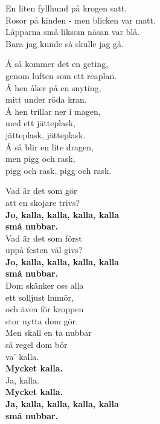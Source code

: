 \documentclass[a6paper, 10pt, twoside]{article}
\begin{document}
\vspace{20pt}
\begin{center}
\end{center}
\begin{lyrics}
En liten fyllhund på krogen satt. \\
Rosor på kinden - men blicken var matt. \\
Läpparna små liksom näsan var blå. \\
Bara jag kunde så skulle jag gå. 
\end{lyrics}
\vspace{20pt}
\begin{center}
\end{center}
\begin{lyrics}
Å så kommer det en geting, \\
genom luften som ett reaplan. \\
Å hen åker på en snyting, \\
mitt under röda kran. \\
Å hen trillar ner i magen, \\
med ett jätteplask, \\
jätteplask, jätteplask. \\
Å så blir en lite dragen, \\
men pigg och rask, \\
pigg och rask, pigg och rask. 
\end{lyrics}

\newpage
\noindent
\begin{center}
\end{center}
\begin{lyrics}
Vad är det som gör \\
att en skojare trivs? \\
\textbf{Jo, kalla, kalla, kalla, kalla \\
små nubbar. \\}
Vad är det som först \\
uppå festen väl givs? \\
\textbf{Jo, kalla, kalla, kalla, kalla \\
små nubbar. \\}
Dom skänker oss alla \\
ett solljust humör, \\
och även för kroppen \\
stor nytta dom gör. \\
Men skall en ta nubbar \\
så regel dom bör \\
va' kalla. \\
\textbf{Mycket kalla.\\}
Ja, kalla. \\
\textbf{Mycket kalla.\\
Ja, kalla, kalla, kalla, kalla \\
små nubbar. }
\end{lyrics}
\end{document}
